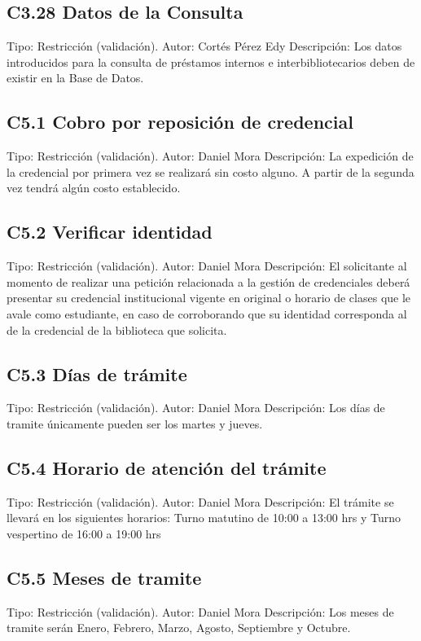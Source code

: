 \subsection{C3.28 Datos de la Consulta}
	\UCli Tipo: Restricción (validación).
	\UCli Autor: Cortés Pérez Edy
	\UCli Descripción: Los datos introducidos para la consulta de préstamos internos e interbibliotecarios deben de existir en la Base de Datos.



\subsection{C5.1 Cobro por reposición de credencial}
	\UCli Tipo: Restricción (validación).
	\UCli Autor: Daniel Mora
	\UCli Descripción: La expedición de la credencial por primera vez se realizará sin costo alguno. A partir de la segunda vez tendrá algún costo establecido. 

\subsection{C5.2 Verificar identidad}
	\UCli Tipo: Restricción (validación).
	\UCli Autor: Daniel Mora
	\UCli Descripción: El solicitante al momento de realizar una petición relacionada a la gestión de credenciales deberá presentar su credencial institucional vigente en original o horario de clases que le avale como estudiante, en caso de  corroborando que su identidad corresponda al de la credencial de la biblioteca que solicita. 
	
\subsection{C5.3 Días de trámite}
	\UCli Tipo: Restricción (validación).
	\UCli Autor: Daniel Mora
	\UCli Descripción: Los días de tramite únicamente pueden ser los martes y jueves.
	
\subsection{C5.4 Horario de atención del trámite}
	\UCli Tipo: Restricción (validación).
	\UCli Autor: Daniel Mora
	\UCli Descripción: El trámite se llevará en los siguientes horarios: Turno matutino de 10:00 a 13:00 hrs y Turno vespertino de 16:00 a 19:00 hrs
	
\subsection{C5.5 Meses de tramite}
	\UCli Tipo: Restricción (validación).
	\UCli Autor: Daniel Mora
	\UCli Descripción: Los meses de tramite serán Enero, Febrero, Marzo, Agosto, Septiembre y Octubre. 
